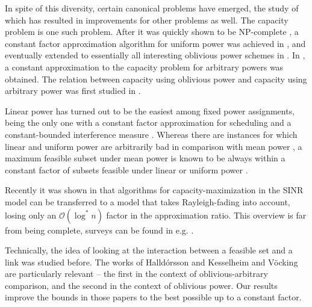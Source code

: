 \documentclass[11pt]{amsart}
\newcommand{\BO}{\mathcal{O}}
\begin{document}
In spite of this diversity, certain canonical problems have emerged, the study of which has resulted in improvements for other problems as well.
The capacity problem is one such problem. After it was quickly
shown to be NP-complete \cite{gouss2007a},  a constant factor approximation 
algorithm for uniform power was achieved in \cite{GHWW09,HW09}, and eventually
extended to essentially all interesting oblivious power schemes in \cite{SODA11}.
In \cite{KesselheimSoda11,KesselheimESA12}, a constant approximation to the capacity problem for arbitrary powers was obtained. 
The relation between capacity using oblivious power and capacity using arbitrary
power was first studied in \cite{us:esa09full}.







Linear power has turned out to be the easiest among fixed power assignments, 
being the only one with a constant factor approximation for
scheduling \cite{FKV09,Tigran11} and a constant-bounded interference measure \cite{FKV09}. Whereas there are instances for
which linear and uniform power are arbitrarily bad in comparison with
mean power \cite{MoWa06}, a maximum feasible subset under mean power
is known to be always within a constant factor of subsets feasible under linear or
uniform power \cite{Tigran11a}.
\iffalse
Capacity maximization has recently been studied with respect to several limitations. E.g. \cite{ALP09} investigated the capacity with uniform and non-uniform power-assignments when the network resources are restricted, \cite{fanghanel2010online} studies an online-version of capacity maximization with respect to SINR-constraints. In \cite{katz2010energy} a tradeoff between energy minimization and maximizing the capacity in the SINR. 
\fi
Recently it was shown in \cite{dams2012scheduling} that algorithms for
capacity-maximization in the SINR model can be transferred to a model
that takes Rayleigh-fading into account, losing only an $\BO(\log^* n)$ factor in the approximation ratio. 
This overview is far from being complete, surveys can be found in e.g.  \cite{GoussevskaiaPW10}.

Technically, the idea of looking at the interaction between a feasible
set and a link was studied before. The works of Halld\'orsson \cite{us:esa09full}
and Kesselheim and V\"ocking \cite{KV10} are particularly relevant -- the
first in the context of oblivious-arbitrary comparison, and the second
in the context of oblivious power. Our results improve the bounds in
those papers to the best possible up to a constant factor.
\end{document}
